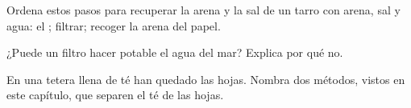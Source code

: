 \begin{exercise}[$\star$]\label{exo:g3:separating-mixtures:9}
Ordena estos pasos para recuperar la arena y la sal de un tarro con
arena, sal y agua:  el ; filtrar; recoger la arena del
papel.
\end{exercise}

\begin{exercise}[$\star\star$]\label{exo:g3:separating-mixtures:10}
¿Puede un filtro hacer potable el agua del mar? Explica por qué no.
\end{exercise}

\begin{exercise}[$\star\star$]\label{exo:g3:separating-mixtures:11}
En una tetera llena de té han quedado las hojas. Nombra dos métodos,
vistos en este capítulo, que separen el té de las hojas.
\end{exercise}
